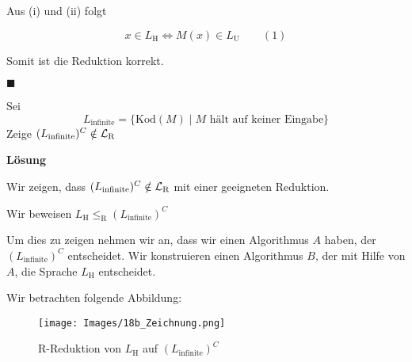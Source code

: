                
            
                Aus (i) und (ii) folgt 
                
                $$x \in L_{\text{H}} \iff M(x) \in L_{\text{U}} \qquad (1)$$
            
                Somit ist die Reduktion korrekt.
            
                \hspace*{0pt}\hfill$\blacksquare$
            
            
            

                Sei $$L_{\text{infinite}} = \{\text{Kod}(M) \mid \text{$M$ hält auf keiner Eingabe}\}$$
                Zeige $(L_{\text{infinite}})^C \notin \mathcal{L}_\text{R}$
            
            
                \textbf{Lösung}

                Wir zeigen, dass $(L_{\text{infinite}})^C \notin \mathcal{L}_\text{R}$ mit einer geeigneten Reduktion.
            
                Wir beweisen $L_{\text{H}} \leq_{\text{R}} (L_{\text{infinite}})^C$
            
                Um dies zu zeigen nehmen wir an, dass wir einen Algorithmus $A$ haben, der $(L_{\text{infinite}})^C$ entscheidet.
                 Wir konstruieren einen Algorithmus $B$, der mit Hilfe von $A$, die Sprache $L_{\text{H}}$ entscheidet. 
                 
                Wir betrachten folgende Abbildung:
                
                \begin{figure}[htp]
                    \centering
                    \texttt{[image: Images/18b\_Zeichnung.png]}
                    \caption{R-Reduktion von $L_{\text{H}}$ auf $(L_{\text{infinite}})^C$}
                \end{figure}
            

